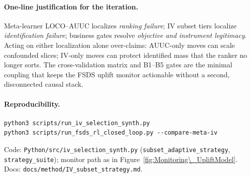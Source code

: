 \paragraph{One-line justification for the iteration.}
Meta-learner LOCO--AUUC localizes \emph{ranking failure}; IV subset tiers
localize \emph{identification failure}; business gates resolve
\emph{objective and instrument legitimacy}.
Acting on either localization alone over-claims: AUUC-only moves can scale
confounded slices; IV-only moves can protect identified mass that the
ranker no longer sorts.
The cross-validation matrix and B1--B5 gates are the minimal coupling that
keeps the FSDS uplift monitor actionable without a second, disconnected
causal stack.

\paragraph{Reproducibility.}
\begin{verbatim}
python3 scripts/run_iv_selection_synth.py
python3 scripts/run_fsds_rl_closed_loop.py --compare-meta-iv
\end{verbatim}
Code: \texttt{Python/src/iv\_selection\_synth.py}
(\texttt{subset\_adaptive\_strategy}, \texttt{strategy\_suite});
monitor path as in Figure~\ref{fig:Monitoring\_UpliftModel}.
Docs: \texttt{docs/method/IV\_subset\_strategy.md}.
